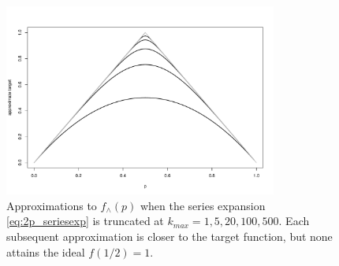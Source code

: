 \documentclass{article}
\theoremstyle{definition}
\begin{document}
\begin{figure}
\centering
\includegraphics[width=0.8\textwidth]{approxtarget_1520100500.pdf}
\caption{Approximations to $f_\wedge(p)$ when the series expansion \eqref{eq:2p_seriesexp} is truncated at $k_{max} = 1,5,20,100,500$. Each subsequent approximation is closer to the target function, but none attains the ideal $f(1/2)=1$.}
\label{fig:qbf_target_approximations}
\end{figure}
\end{document}
